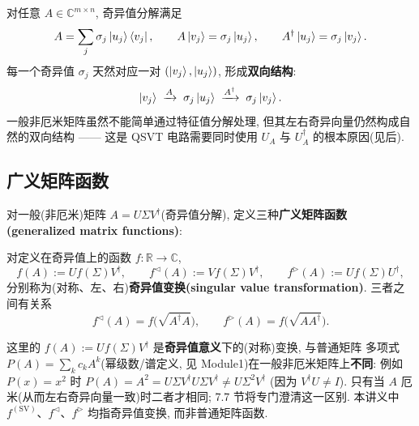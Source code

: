 \documentclass[utf8]{article} %
\numberwithin{equation}{section}   %
\newtheorem{Def}{\hskip 2em {\color{green} 定义}}[subsection]
\newtheorem{Note}{\hskip 2em {\color{red} 注}}[subsection]
\begin{document}
对任意 $A \in \mathbb{C}^{m \times n}$, 奇异值分解满足
\begin{equation}
    A = \sum_j \sigma_j \ket{u_j}\bra{v_j},
    \qquad
    A\ket{v_j} = \sigma_j\ket{u_j}, \qquad
    A^\dagger\ket{u_j} = \sigma_j\ket{v_j}.
\end{equation}
每一个奇异值 $\sigma_j$ 天然对应一对 $(\ket{v_j}, \ket{u_j})$, 形成\textbf{双向结构}:
\begin{equation}
    \ket{v_j} \;\xrightarrow{A}\; \sigma_j\ket{u_j}
    \;\xrightarrow{A^\dagger}\; \sigma_j\ket{v_j}.
\end{equation}
一般非厄米矩阵虽然不能简单通过特征值分解处理, 但其左右奇异向量仍然构成自然的双向结构
—— 这是 QSVT 电路需要同时使用 $U_A$ 与 $U_A^\dagger$ 的根本原因(见后).

\subsection{广义矩阵函数}

对一般(非厄米)矩阵 $A = U\Sigma V^\dagger$(奇异值分解), 定义三种\textbf{广义矩阵函数(generalized matrix functions)}:

\begin{Def}[广义矩阵函数]
    对定义在奇异值上的函数 $f: \mathbb{R} \to \mathbb{C}$,
    \begin{equation}
        f(A) := U f(\Sigma) V^\dagger, \qquad
        f^\triangleleft(A) := V f(\Sigma) V^\dagger, \qquad
        f^\triangleright(A) := U f(\Sigma) U^\dagger,
    \end{equation}
    分别称为(对称、左、右)\textbf{奇异值变换(singular value transformation)}. 三者之间有关系
    \begin{equation}
        f^\triangleleft(A) = f\big(\sqrt{A^\dagger A}\big), \qquad
        f^\triangleright(A) = f\big(\sqrt{AA^\dagger}\big).
    \end{equation}
\end{Def}

\begin{Note}
    这里的 $f(A) := U f(\Sigma) V^\dagger$ 是\textbf{奇异值意义}下的(对称)变换, 与普通矩阵
    多项式 $P(A) = \sum_k c_k A^k$(幂级数/谱定义, 见 Module1)在一般非厄米矩阵上\textbf{不同}:
    例如 $P(x) = x^2$ 时 $P(A) = A^2 = U\Sigma V^\dagger U\Sigma V^\dagger \ne U\Sigma^2 V^\dagger$
    (因为 $V^\dagger U \ne I$). 只有当 $A$ 厄米(从而左右奇异向量一致)时二者才相同;
    7.7 节将专门澄清这一区别. 本讲义中 $f^{(\mathrm{SV})}$、$f^\triangleleft$、$f^\triangleright$
    均指奇异值变换, 而非普通矩阵函数.
\end{Note}
\end{document}
